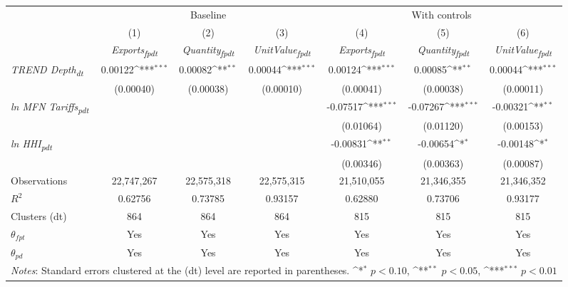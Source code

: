 {
\def\sym#1{\ifmmode^{#1}\else\(^{#1}\)\fi}
\begin{tabular}{l*{6}{c}}
\toprule
&\multicolumn{3}{c}{Baseline}&\multicolumn{3}{c}{With controls}\\\cmidrule(lr){2-4}\cmidrule(lr){5-7}
&(1)&(2)&(3)&(4)&(5)&(6)\\
&\textit{Exports\textsubscript{fpdt}}&\textit{Quantity\textsubscript{fpdt}}&\textit{UnitValue\textsubscript{fpdt}}&\textit{Exports\textsubscript{fpdt}}&\textit{Quantity\textsubscript{fpdt}}&\textit{UnitValue\textsubscript{fpdt}}\\
\midrule
\textit{TREND Depth\textsubscript{dt}} & 0.00122\sym{***} & 0.00082\sym{**} & 0.00044\sym{***} & 0.00124\sym{***} & 0.00085\sym{**} & 0.00044\sym{***}\\
 & (0.00040) & (0.00038) & (0.00010) & (0.00041) & (0.00038) & (0.00011)\\
\addlinespace
\textit{ln MFN Tariffs\textsubscript{pdt}} &  &  &  & -0.07517\sym{***} & -0.07267\sym{***} & -0.00321\sym{**}\\
 &  &  &  & (0.01064) & (0.01120) & (0.00153)\\
\addlinespace
\textit{ln HHI\textsubscript{pdt}} &  &  &  & -0.00831\sym{**} & -0.00654\sym{*} & -0.00148\sym{*}\\
 &  &  &  & (0.00346) & (0.00363) & (0.00087)\\
\midrule
Observations & 22,747,267 & 22,575,318 & 22,575,315 & 21,510,055 & 21,346,355 & 21,346,352\\
$R^{2}$ & 0.62756 & 0.73785 & 0.93157 & 0.62880 & 0.73706 & 0.93177\\
Clusters (dt) & 864 & 864 & 864 & 815 & 815 & 815\\
$\theta_{fpt}$ & Yes & Yes & Yes & Yes & Yes & Yes\\
$\theta_{pd}$ & Yes & Yes & Yes & Yes & Yes & Yes\\
\bottomrule
\multicolumn{7}{l}{\footnotesize \textit{Notes}: Standard errors clustered at the (dt) level are reported in parentheses. \sym{*} \(p<0.10\), \sym{**} \(p<0.05\), \sym{***} \(p<0.01\)}\\
\end{tabular}
}
